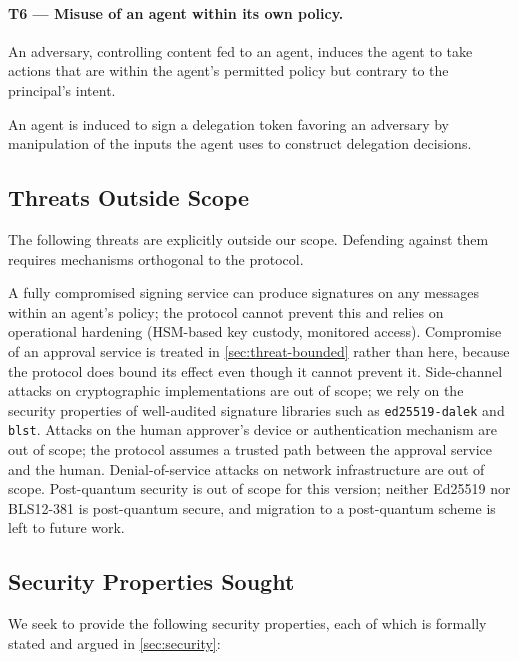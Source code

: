 \documentclass[11pt,a4paper]{article}
\begin{document}
\paragraph{T6 --- Misuse of an agent within its own policy.}

 An adversary, controlling
content fed to an agent, induces the agent to take actions that are
within the agent's permitted policy but contrary to the principal's
intent.

 An agent is induced to sign
a delegation token favoring an adversary by manipulation of the inputs
the agent uses to construct delegation decisions.

\subsection{Threats Outside Scope}
\label{sec:threat-outside}

The following threats are explicitly outside our scope. Defending against
them requires mechanisms orthogonal to the protocol.

A fully compromised signing service can produce signatures on any
messages within an agent's policy; the protocol cannot prevent this and
relies on operational hardening (HSM-based key custody, monitored
access). Compromise of an approval service is treated in
\cref{sec:threat-bounded} rather than here, because the protocol does
bound its effect even though it cannot prevent it. Side-channel attacks on cryptographic implementations are
out of scope; we rely on the security properties of well-audited
signature libraries such as \texttt{ed25519-dalek} and \texttt{blst}. Attacks on the human approver's device or
authentication mechanism are out of scope; the protocol assumes a trusted
path between the approval service and the human. Denial-of-service attacks
on network infrastructure are out of scope. Post-quantum security is out
of scope for this version; neither Ed25519 nor BLS12-381 is
post-quantum secure, and migration to a post-quantum scheme is left to
future work.

\subsection{Security Properties Sought}
\label{sec:threat-properties}

We seek to provide the following security properties, each of which is
formally stated and argued in \cref{sec:security}:
\end{document}
